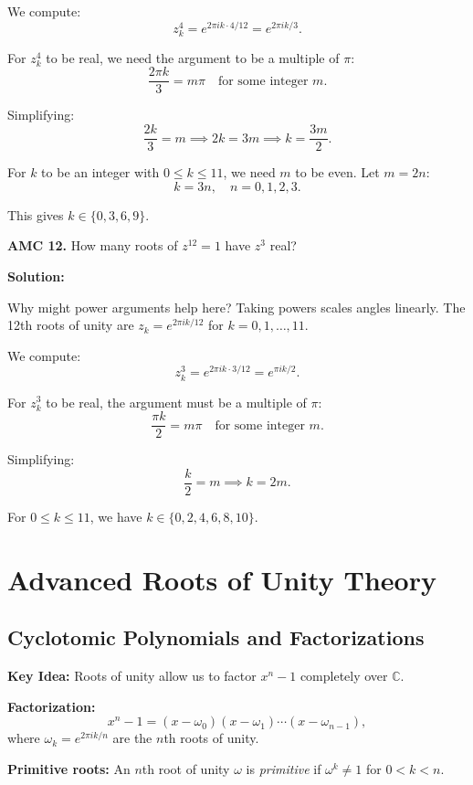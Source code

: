 \documentclass[12pt]{extarticle}
\begin{document}
We compute:
\[
z_k^4 = e^{2\pi i k \cdot 4/12} = e^{2\pi i k/3}.
\]

For $z_k^4$ to be real, we need the argument to be a multiple of $\pi$:
\[
\frac{2\pi k}{3} = m\pi \quad \text{for some integer } m.
\]

Simplifying:
\[
\frac{2k}{3} = m \implies 2k = 3m \implies k = \frac{3m}{2}.
\]

For $k$ to be an integer with $0 \le k \le 11$, we need $m$ to be even. Let $m = 2n$:
\[
k = 3n, \quad n = 0, 1, 2, 3.
\]

This gives $k \in \{0, 3, 6, 9\}$.


\begin{examplebox}
\textbf{AMC 12.} How many roots of $z^{12}=1$ have $z^3$ real?
\end{examplebox}

\textbf{Solution:}

Why might power arguments help here? Taking powers scales angles linearly.
The 12th roots of unity are $z_k = e^{2\pi i k/12}$ for $k = 0, 1, \ldots, 11$.

We compute:
\[
z_k^3 = e^{2\pi i k \cdot 3/12} = e^{\pi i k/2}.
\]

For $z_k^3$ to be real, the argument must be a multiple of $\pi$:
\[
\frac{\pi k}{2} = m\pi \quad \text{for some integer } m.
\]

Simplifying:
\[
\frac{k}{2} = m \implies k = 2m.
\]

For $0 \le k \le 11$, we have $k \in \{0, 2, 4, 6, 8, 10\}$.



\section{Advanced Roots of Unity Theory}

\subsection*{Cyclotomic Polynomials and Factorizations}

\textbf{Key Idea:} Roots of unity allow us to factor $x^n - 1$ completely over $\mathbb{C}$.

\textbf{Factorization:} 
\[
x^n - 1 = (x - \omega_0)(x - \omega_1) \cdots (x - \omega_{n-1}),
\]
where $\omega_k = e^{2\pi ik/n}$ are the $n$th roots of unity.

\textbf{Primitive roots:} An $n$th root of unity $\omega$ is \emph{primitive} if $\omega^k \neq 1$ for $0 < k < n$.
\end{document}
